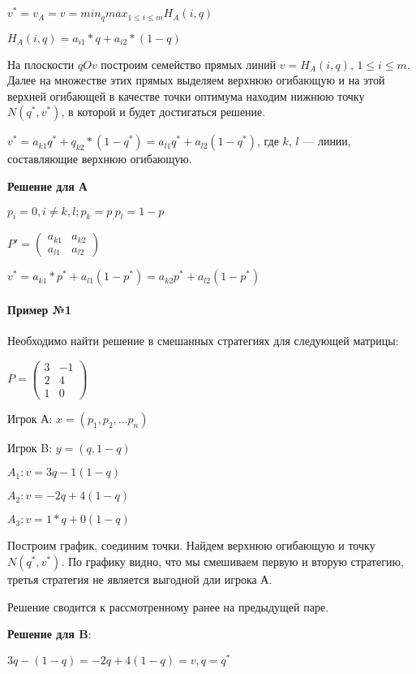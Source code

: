 \documentclass{article}
\begin{document}
$v^{*} = v_{A} = v = min_{q} max_{1 \le i \le m} H_{A}(i, q)$

$H_{A}(i, q) = a_{i1} * q + a_{i2} * (1 - q)$

На плоскости $qOv$ построим семейство прямых линий $v = H_{A}(i, q)$, $1 \le i \le m$. Далее на множестве этих прямых выделяем верхнюю огибающую и на этой верхней огибающей в качестве точки оптимума находим нижнюю точку $N(q^{*}, v^{*})$, в которой и будет достигаться решение.

$v^{*} = a_{k1} q^{*} + q_{k2} * (1 - q^{*}) = a_{l1} q^{*} + a_{l2} (1 - q^{*})$, где $k$, $l$ — линии, составляющие верхнюю огибающую.

\textbf{Решение для А}

$p_{i} = 0, i \ne k, l; p_k = p_, p_{l} = 1 - p$

$P' = \begin{pmatrix}
	a_{k1} & a_{k2} \\
	a_{l1} & a_{l2}
\end{pmatrix}$

$v^{*} = a_{k1} * p^{*} + a_{l1} (1 - p^{*}) = a_{k2} p^{*} + a_{l2} (1 - p^{*})$

\paragraph{Пример №1} Необходимо найти решение в смешанных стратегиях для следующей матрицы:

$P = \begin{pmatrix}
	3 & -1 \\
	2 & 4 \\
	1 & 0
\end{pmatrix}$

Игрок А: $x = (p_1, p_2, \dots p_n)$

Игрок B: $y = (q, 1-q)$

$A_{1}: v = 3q - 1(1-q)$

$A_{2}: v = -2q + 4(1 - q)$

$A_{3}: v = 1 * q + 0 (1 - q)$

Построим график, соединим точки. Найдем верхнюю огибающую и точку $N(q^{*}, v^{*})$. По графику видно, что мы смешиваем первую и вторую стратегию, третья стратегия не является выгодной дли игрока А.

Решение сводится к рассмотренному ранее на предыдущей паре.

\textbf{Решение для B}:

$3q - (1 - q) = -2 q + 4 (1 - q) = v, q = q^{*}$
\end{document}
